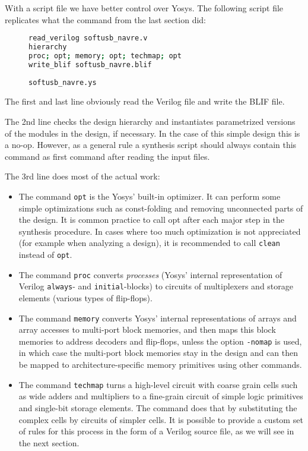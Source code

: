 \documentclass[9pt,technote,a4paper]{IEEEtran}
\begin{document}
With a script file we have better control over Yosys. The following script
file replicates what the command from the last section did:

\begin{figure}[H]
\begin{lstlisting}[language=sh]
read_verilog softusb_navre.v
hierarchy
proc; opt; memory; opt; techmap; opt
write_blif softusb_navre.blif
\end{lstlisting}
 \renewcommand{\figurename}{Listing}
\caption{\tt softusb\_navre.ys}
\end{figure}

The first and last line obviously read the Verilog file and write the BLIF
file. 

\medskip

The 2nd line checks the design hierarchy and instantiates parametrized 
versions of the modules in the design, if necessary. In the case of this
simple design this is a no-op. However, as a general rule a synthesis script
should always contain this command as first command after reading the input
files.

\medskip

The 3rd line does most of the actual work:

\begin{itemize}
\item The command {\tt opt} is the Yosys' built-in optimizer. It can perform
some simple optimizations such as const-folding and removing unconnected parts
of the design. It is common practice to call opt after each major step in the
synthesis procedure. In cases where too much optimization is not appreciated
(for example when analyzing a design), it is recommended to call {\tt clean}
instead of {\tt opt}.
\item The command {\tt proc} converts {\it processes} (Yosys' internal
representation of Verilog {\tt always}- and {\tt initial}-blocks) to circuits
of multiplexers and storage elements (various types of flip-flops).
\item The command {\tt memory} converts Yosys' internal representations of 
arrays and array accesses to multi-port block memories, and then maps this
block memories to address decoders and flip-flops, unless the option {\tt -nomap}
is used, in which case the multi-port block memories stay in the design
and can then be mapped to architecture-specific memory primitives using
other commands.
\item The command {\tt techmap} turns a high-level circuit with coarse grain
cells such as wide adders and multipliers to a fine-grain circuit of simple
logic primitives and single-bit storage elements. The command does that by
substituting the complex cells by circuits of simpler cells. It is possible
to provide a custom set of rules for this process in the form of a Verilog
source file, as we will see in the next section.
\end{itemize}
\end{document}
